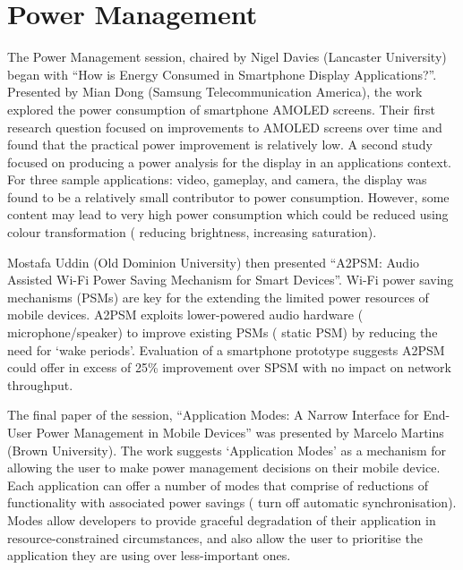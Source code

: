 \section{Power Management}
\label{sec:power}
The Power Management session, chaired by Nigel Davies (Lancaster University)
began with ``How is Energy Consumed in Smartphone Display Applications?''. 
Presented by Mian Dong (Samsung Telecommunication America), the work explored
the power consumption of smartphone AMOLED screens. Their first 
research question focused on improvements to AMOLED screens over time
and found that the practical power improvement is relatively low.
A second study focused on 
producing a power analysis for the display in an applications context. For three 
sample applications: video, gameplay, and camera, the display was found to be a 
relatively small contributor to power consumption. However, some content may lead 
to very high power consumption which could be reduced using colour 
transformation (\eg{} reducing brightness, increasing saturation).

Mostafa Uddin (Old Dominion University) then presented ``A2PSM: Audio Assisted 
Wi-Fi Power Saving Mechanism for Smart Devices''. Wi-Fi power saving mechanisms 
(PSMs) are key for the extending the limited power resources of mobile devices. 
A2PSM exploits lower-powered audio hardware (\eg{} microphone\slash speaker) to 
improve existing PSMs (\eg{} static PSM) by reducing the need for `wake periods'. 
Evaluation of a smartphone prototype suggests A2PSM could offer in excess of 25\%
improvement over SPSM with no impact on network throughput.

The final paper of the session, ``Application Modes: A Narrow Interface for End-
User Power Management in Mobile Devices'' was presented by Marcelo Martins (Brown 
University). The work suggests `Application Modes' as a mechanism for allowing 
the user to make power management decisions on their mobile device. Each 
application can offer a number of modes that comprise of reductions of 
functionality with associated power savings (\eg{} turn off automatic 
synchronisation). Modes allow developers to provide graceful degradation of their 
application in resource-constrained circumstances, and also allow the user to 
prioritise the application they are using over less-important ones.